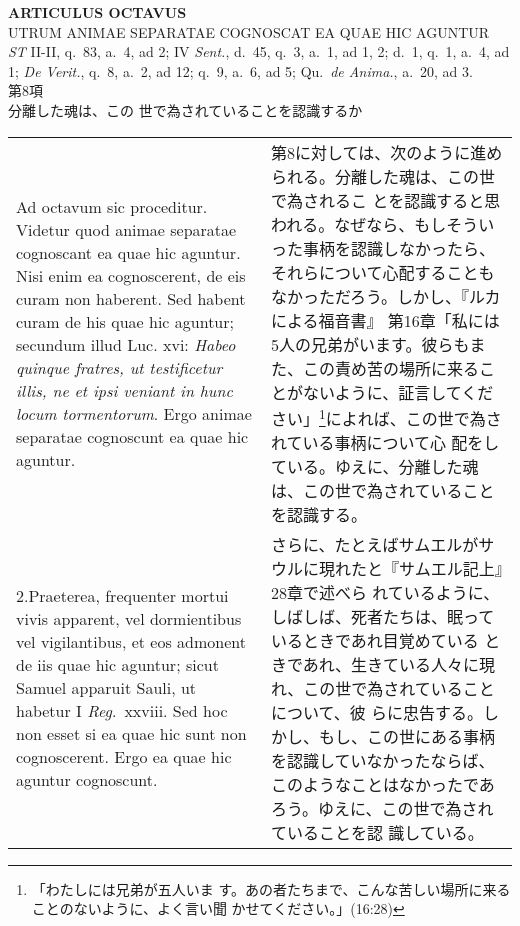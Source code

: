 \documentclass[10pt]{jsarticle} %
\begin{document}
\newpage
{}

\begin{center}
{\Large {\bf ARTICULUS OCTAVUS}}\\ {\large UTRUM ANIMAE SEPARATAE
COGNOSCAT EA QUAE HIC AGUNTUR}\\ {\footnotesize {\it ST} II-II, q.~83,
a.~4, ad 2; IV {\it Sent.}, d.~45, q.~3, a.~1, ad 1, 2; d.~1, q.~1,
a.~4, ad 1; {\it De Verit.}, q.~8, a.~2, ad 12; q.~9, a.~6, ad 5;
Qu.~{\it de Anima.}, a.~20, ad 3.}\\ {\Large 第8項\\分離した魂は、この
世で為されていることを認識するか}
\end{center}

\begin{longtable}{p{21em}p{21em}}


{\huge A}{\sc d octavum sic proceditur}. Videtur quod animae separatae
cognoscant ea quae hic aguntur. Nisi enim ea cognoscerent, de eis
curam non haberent. Sed habent curam de his quae hic aguntur; secundum
illud Luc. {\sc xvi}: {\it Habeo quinque fratres, ut testificetur
illis, ne et ipsi veniant in hunc locum tormentorum}. Ergo animae
separatae cognoscunt ea quae hic aguntur.

&


第8に対しては、次のように進められる。分離した魂は、この世で為されるこ
とを認識すると思われる。なぜなら、もしそういった事柄を認識しなかったら、
それらについて心配することもなかっただろう。しかし、『ルカによる福音書』
第16章「私には5人の兄弟がいます。彼らもまた、この責め苦の場所に来るこ
とがないように、証言してください」\footnote{「わたしには兄弟が五人いま
す。あの者たちまで、こんな苦しい場所に来ることのないように、よく言い聞
かせてください。」(16:28)}によれば、この世で為されている事柄について心
配をしている。ゆえに、分離した魂は、この世で為されていることを認識する。

\\




2.{\sc Praeterea}, frequenter mortui vivis apparent, vel dormientibus
vel vigilantibus, et eos admonent de iis quae hic aguntur; sicut
Samuel apparuit Sauli, ut habetur I {\it Reg}.~{\sc xxviii}. Sed hoc
non esset si ea quae hic sunt non cognoscerent. Ergo ea quae hic
aguntur cognoscunt.

&

さらに、たとえばサムエルがサウルに現れたと『サムエル記上』28章で述べら
れているように、しばしば、死者たちは、眠っているときであれ目覚めている
ときであれ、生きている人々に現れ、この世で為されていることについて、彼
らに忠告する。しかし、もし、この世にある事柄を認識していなかったならば、
このようなことはなかったであろう。ゆえに、この世で為されていることを認
識している。


\end{longtable}
\end{document}
